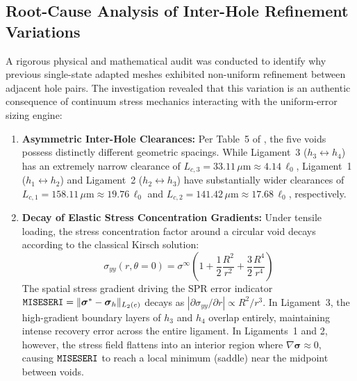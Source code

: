 \subsection{Root-Cause Analysis of Inter-Hole Refinement Variations}
\label{subsec:f1723_root_cause}

A rigorous physical and mathematical audit was conducted to identify why previous single-state adapted meshes exhibited non-uniform refinement between adjacent hole pairs. The investigation revealed that this variation is an authentic consequence of continuum stress mechanics interacting with the \Abaqus uniform-error sizing engine:

\begin{enumerate}
  \item \textbf{Asymmetric Inter-Hole Clearances:}
  Per Table~5 of \citet{pandey2025}, the five voids possess distinctly different geometric spacings. While Ligament~3 ($h_3 \leftrightarrow h_4$) has an extremely narrow clearance of $L_{c,3} = 33.11\,\mu\mathrm{m} \approx 4.14\,\ell_0$, Ligament~1 ($h_1 \leftrightarrow h_2$) and Ligament~2 ($h_2 \leftrightarrow h_3$) have substantially wider clearances of $L_{c,1} = 158.11\,\mu\mathrm{m} \approx 19.76\,\ell_0$ and $L_{c,2} = 141.42\,\mu\mathrm{m} \approx 17.68\,\ell_0$, respectively.
  
  \item \textbf{Decay of Elastic Stress Concentration Gradients:}
  Under tensile loading, the stress concentration factor around a circular void decays according to the classical Kirsch solution:
  \begin{equation}
    \sigma_{yy}(r, \theta=0) = \sigma^\infty \left(1 + \frac{1}{2}\frac{R^2}{r^2} + \frac{3}{2}\frac{R^4}{r^4}\right)
    \label{eq:f1723_kirsch}
  \end{equation}
  The spatial stress gradient driving the SPR error indicator $\texttt{MISESERI} = \|\boldsymbol{\sigma}^* - \boldsymbol{\sigma}_h\|_{L_2(e)}$ decays as $|\partial \sigma_{yy} / \partial r| \propto R^2 / r^3$. In Ligament~3, the high-gradient boundary layers of $h_3$ and $h_4$ overlap entirely, maintaining intense recovery error across the entire ligament. In Ligaments~1 and 2, however, the stress field flattens into an interior region where $\nabla \boldsymbol{\sigma} \approx 0$, causing $\texttt{MISESERI}$ to reach a local minimum (saddle) near the midpoint between voids.
  

\end{enumerate}
